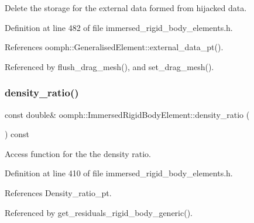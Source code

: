 Delete the storage for the external data formed from hijacked data. 



Definition at line 482 of file immersed\+\_\+rigid\+\_\+body\+\_\+elements.\+h.



References oomph\+::\+Generalised\+Element\+::external\+\_\+data\+\_\+pt().



Referenced by flush\+\_\+drag\+\_\+mesh(), and set\+\_\+drag\+\_\+mesh().

\mbox{\label{classoomph_1_1ImmersedRigidBodyElement_af080ce9be7657e243e94ab303d5b52b1}} 
\subsubsection{\texorpdfstring{density\+\_\+ratio()}{density\_ratio()}}
{\footnotesize\ttfamily const double\& oomph\+::\+Immersed\+Rigid\+Body\+Element\+::density\+\_\+ratio (\begin{DoxyParamCaption}{ }\end{DoxyParamCaption}) const\hspace{0.3cm}{\ttfamily [inline]}}



Access function for the the density ratio. 



Definition at line 410 of file immersed\+\_\+rigid\+\_\+body\+\_\+elements.\+h.



References Density\+\_\+ratio\+\_\+pt.



Referenced by get\+\_\+residuals\+\_\+rigid\+\_\+body\+\_\+generic().

\mbox{\label{classoomph_1_1ImmersedRigidBodyElement_a8d7b1180f19e84d85ee1415a811a0047}} 
